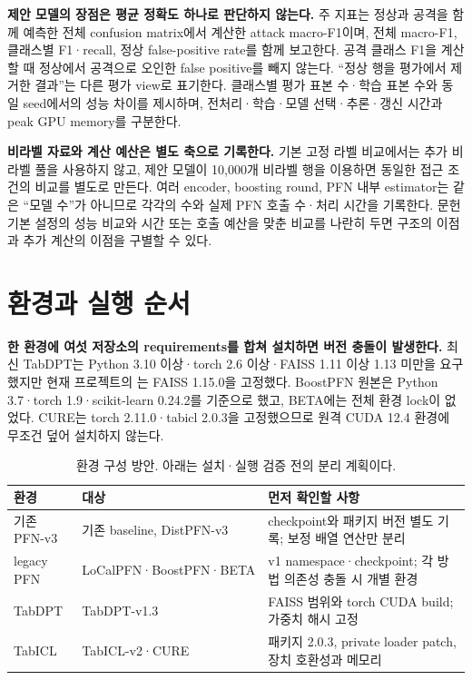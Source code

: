 \textbf{제안 모델의 장점은 평균 정확도 하나로 판단하지 않는다.} 주 지표는 정상과 공격을 함께 예측한 전체 confusion matrix에서 계산한 attack macro-F1이며, 전체 macro-F1, 클래스별 F1·recall, 정상 false-positive rate를 함께 보고한다. 공격 클래스 F1을 계산할 때 정상에서 공격으로 오인한 false positive를 빼지 않는다. ``정상 행을 평가에서 제거한 결과''는 다른 평가 view로 표기한다. 클래스별 평가 표본 수·학습 표본 수와 동일 seed에서의 성능 차이를 제시하며, 전처리·학습·모델 선택·추론·갱신 시간과 peak GPU memory를 구분한다.

\textbf{비라벨 자료와 계산 예산은 별도 축으로 기록한다.} 기본 고정 라벨 비교에서는 추가 비라벨 풀을 사용하지 않고, 제안 모델이 10,000개 비라벨 행을 이용하면 동일한 접근 조건의 비교를 별도로 만든다. 여러 encoder, boosting round, PFN 내부 estimator는 같은 ``모델 수''가 아니므로 각각의 수와 실제 PFN 호출 수·처리 시간을 기록한다. 문헌 기본 설정의 성능 비교와 시간 또는 호출 예산을 맞춘 비교를 나란히 두면 구조의 이점과 추가 계산의 이점을 구별할 수 있다.

\section{환경과 실행 순서}
\textbf{한 환경에 여섯 저장소의 requirements를 합쳐 설치하면 버전 충돌이 발생한다.} 최신 TabDPT는 Python 3.10 이상·torch 2.6 이상·FAISS 1.11 이상 1.13 미만을 요구했지만 현재 프로젝트의 는 FAISS 1.15.0을 고정했다. BoostPFN 원본은 Python 3.7·torch 1.9·scikit-learn 0.24.2를 기준으로 했고, BETA에는 전체 환경 lock이 없었다. CURE는 torch 2.11.0·tabicl 2.0.3을 고정했으므로 원격 CUDA 12.4 환경에 무조건 덮어 설치하지 않는다.

\begin{table}[H]\centering\small
\caption{환경 구성 방안. 아래는 설치·실행 검증 전의 분리 계획이다.}
\begin{tabularx}{\linewidth}{p{.20\linewidth}YY}\toprule
환경 & 대상 & 먼저 확인할 사항\\\midrule
기존 PFN-v3 & 기존 baseline, DistPFN-v3 & checkpoint와 패키지 버전 별도 기록; 보정 배열 연산만 분리\\
legacy PFN & LoCalPFN·BoostPFN·BETA & v1 namespace·checkpoint; 각 방법 의존성 충돌 시 개별 환경\\
TabDPT & TabDPT-v1.3 & FAISS 범위와 torch CUDA build; 가중치 해시 고정\\
TabICL & TabICL-v2·CURE & 패키지 2.0.3, private loader patch, 장치 호환성과 메모리\\\bottomrule
\end{tabularx}
\end{table}

